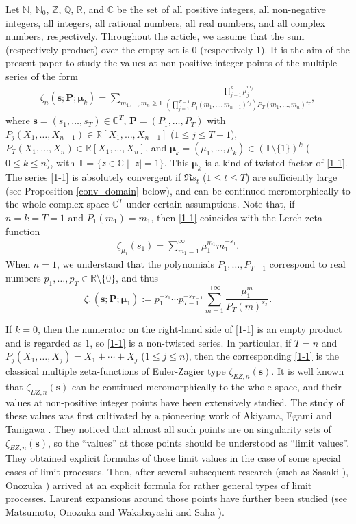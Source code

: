\documentclass[a4paper,12pt]{article}
\theoremstyle{definition}
\numberwithin{equation}{section}
\def\N{{\mathbb N}}
\def\Z{{\mathbb Z}}
\def\Q{{\mathbb Q}}
\def\R{{\mathbb R}}
\def\C{{\mathbb C}}
\begin{document}
Let $\N$, $\N_0$, $\Z$, $\Q$, $\R$, and $\C$ be the set of
all positive integers, all non-negative integers, 
all integers, all rational numbers, all real numbers, and all complex numbers, respectively. Throughout the article, we assume that the sum (respectively product) over the empty set is $0$ (respectively $1$).
It is the aim of the present paper to study the values at non-positive integer points of
the multiple series of the form
\begin{align}\label{1-1}
\zeta_n(\mathbf{s};\mathbf{P};\boldsymbol{\mu}_k)=\sum_{m_1,\ldots,m_n\geq 1}
\frac{\prod_{j=1}^{k}\mu_j^{m_j}}{\left(\prod_{j=1}^{T-1} P_j(m_1,\ldots,m_{n-1})^{s_j}\right)P_T(m_1,\ldots,m_n)^{s_T}},
\end{align}
where $\mathbf{s}=(s_1,\ldots,s_T)\in\mathbb{C}^T$, 
$\mathbf{P}=(P_1,\ldots,P_T)$ with $P_j(X_1,\ldots,X_{n-1})\in \mathbb{R}[X_1,\ldots,X_{n-1}]$
($1\leq j\leq T-1$), $P_T(X_1,\ldots,X_n)\in\mathbb{R}[X_1,\ldots,X_n]$,
and $\boldsymbol{\mu}_k=(\mu_1,\ldots,\mu_{k})\in(\mathbb{T}\setminus\{1\})^k$
($0\leq k\leq n$), 
with $\mathbb{T}=\{z\in\mathbb{C}\mid |z|=1\}$. 
This $\boldsymbol{\mu}_k$ is a kind of twisted factor of \eqref{1-1}.
The series \eqref{1-1} is absolutely convergent if $\Re s_t$ ($1\leq t\leq T$) are sufficiently large (see Proposition \ref{conv_domain} below), and can be continued meromorphically to the whole complex space $\C^T$ under certain assumptions.
Note that, if $n=k=T=1$ and $P_1(m_1)=m_1$, then \eqref{1-1} coincides with the
Lerch zeta-function 
\begin{align}\label{Lerch_def}
\zeta_{\mu_1}(s_1)=\sum_{m_1=1}^{\infty}\mu_1^{m_1}m_1^{-s_1}.
\end{align}
When $n=1$, we understand that the polynomials $P_1,\ldots,P_{T-1}$ correspond to real numbers $p_1,\ldots,p_T \in \mathbb{R} \setminus \{0\}$, and thus
$$\zeta_1(\mathbf{s};\mathbf{P};\boldsymbol{\mu}_1):=p_1^{-s_1} \cdots p_{T-1}^{-s_{T-1}} \sum_{m=1}^{+\infty} \frac{\mu_1^m}{P_T(m)^{s_T}}.$$

If $k=0$, then the numerator on the right-hand side of \eqref{1-1} is an empty product and is regarded as $1$,  so \eqref{1-1} is a non-twisted series.
In particular, if $T=n$ and $P_j(X_1,\ldots,X_j)=X_1+\cdots+X_j$ ($1\leq j\leq n$), then the corresponding
\eqref{1-1} is the classical multiple zeta-functions of Euler-Zagier type
$\zeta_{EZ,n}(\mathbf{s})$.
It is well known that $\zeta_{EZ,n}(\mathbf{s})$ can be continued meromorphically to the whole space, and their
values at non-positive integer points have been extensively studied.  The study of these values was
first cultivated by a pioneering work of Akiyama, Egami and Tanigawa \cite{AET01}.
They noticed that almost all such points are on singularity sets of $\zeta_{EZ,n}(\mathbf{s})$, 
so the ``values'' at those points should be understood as ``limit values''.
They obtained explicit formulas of those limit values in the case of some special cases of
limit processes.
Then, after several subsequent research
(such as Sasaki \cite{Sasa09}), Onozuka \cite{Onoz13}) arrived at an explicit
formula for rather general types of limit processes.
Laurent expansions around those points have further been studied (see Matsumoto, Onozuka
and Wakabayashi \cite{MOW20} and Saha \cite{Saha22}).
\end{document}
